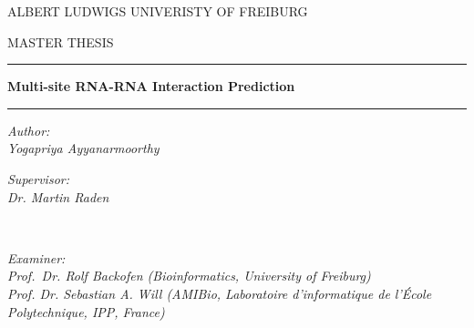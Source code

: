  
 \begin{titlepage}
 	\begin{center}
 		
 		
 		{\scshape\Large ALBERT LUDWIGS UNIVERISTY OF FREIBURG \par}\vspace{0.8cm} %
 		\textsc{\Large MASTER THESIS} %
 		
 		\vspace{0.5cm}
 		
 		\hrule  %
 			\vspace{0.4cm}
 		{\huge \bfseries  Multi-site RNA-RNA Interaction Prediction \par}
 		
 		\vspace{0.4cm} %
 		\hrule  %
 		
 	\vspace{0.9cm}
 		
 		\begin{minipage}[t]{0.4\textwidth}
 			\begin{flushleft} \large
 				\emph{Author:}\\
 				\textit{Yogapriya Ayyanarmoorthy}  %
 			\end{flushleft}
 		\end{minipage}
 		\begin{minipage}[t]{0.4\textwidth}
 			\begin{flushright} \large
 				\emph{Supervisor:} \\
 				\textit{Dr. Martin Raden}
 			\end{flushright}
 		\end{minipage}\\[1cm]
 	\begin{minipage}[t]{0.4\textwidth}
 		\begin{center} \large
 			\emph{Examiner:} \\
 			\textit{Prof.~Dr. Rolf Backofen (Bioinformatics, University of Freiburg)}\\
 			\textit{Prof. Dr. Sebastian A. Will (AMIBio, Laboratoire d'informatique de l'École Polytechnique, IPP, France)}
 		\end{center}
 	\end{minipage}%
 	

\end{center}
\end{titlepage}
